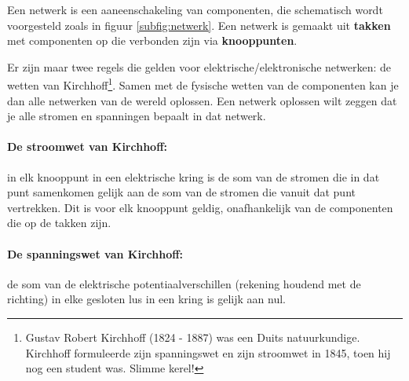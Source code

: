 \documentclass{article}
\begin{document}
			Een netwerk is een aaneenschakeling van componenten, die schematisch wordt voorgesteld zoals in figuur \ref{subfig:netwerk}. Een netwerk is gemaakt uit \textbf{takken}  met componenten op die verbonden zijn via \textbf{knooppunten}. 

			 Er zijn maar twee regels die gelden voor elektrische/elektronische netwerken: de wetten van Kirchhoff\footnote{Gustav Robert Kirchhoff (1824 - 1887) was een Duits natuurkundige. Kirchhoff formuleerde zijn spanningswet en zijn stroomwet in 1845, toen hij nog een student was. Slimme kerel!}. Samen met de fysische wetten van de componenten kan je dan alle netwerken van de wereld oplossen. Een netwerk oplossen wilt zeggen dat je alle stromen en spanningen bepaalt in dat netwerk.

			\paragraph*{De stroomwet van Kirchhoff:} in elk knooppunt in een elektrische kring is de som van de stromen die in dat punt samenkomen gelijk aan de som van de stromen die vanuit dat punt vertrekken. Dit is voor elk knooppunt geldig, onafhankelijk van de componenten die op de takken zijn. 
			\paragraph*{De spanningswet van Kirchhoff:} de som van de elektrische potentiaalverschillen (rekening houdend met de richting) in elke gesloten lus in een kring is gelijk aan nul. 
\end{document}
